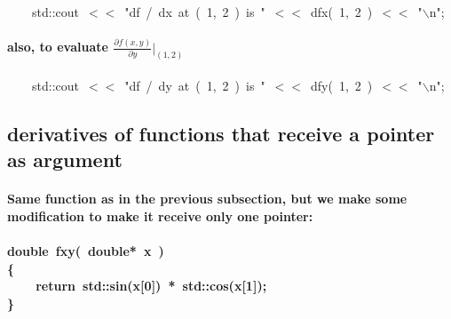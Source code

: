\documentclass[9pt,onside]{article}
\newcommand{\hlstd}[1]{\textcolor[rgb]{0.2,0,0.4}{#1}}
\newcommand{\hlnum}[1]{\textcolor[rgb]{0.2,0.73,0.02}{#1}}
\newcommand{\hlesc}[1]{\textcolor[rgb]{0.65,0.09,0.38}{#1}}
\newcommand{\hlstr}[1]{\textcolor[rgb]{0.09,0.38,0.65}{#1}}
\newcommand{\hlopt}[1]{\textcolor[rgb]{0.33,0.33,0.33}{#1}}
\newcommand{\hlkwa}[1]{\textcolor[rgb]{1,0.19,0.19}{#1}}
\newcommand{\hlkwb}[1]{\textcolor[rgb]{0.96,0.55,0.14}{#1}}
\newcommand{\hlkwd}[1]{\textcolor[rgb]{0.82,0.11,0.93}{#1}}
\begin{document}
\hlstd{\ \ \ \ }\hlstd{std}\hlopt{::}\hlstd{cout\ }\hlopt{$<$$<$\ }\hlstd{}\hlstr{"df\ /\ dx\ at\ (\ 1,\ 2\ )\ is\ "}\hlstd{\ }\hlopt{$<$$<$\ }\hlstd{}\hlkwd{dfx}\hlstd{}\hlopt{(\ }\hlstd{}\hlnum{1}\hlstd{}\hlopt{,\ }\hlstd{}\hlnum{2\ }\hlstd{}\hlopt{)\ $<$$<$\ }\hlstd{}\hlstr{"}\hlesc{$\backslash$n}\hlstr{"}\hlstd{}\hlopt{;}\hspace*{\fill}\\

\paragraph{also, to evaluate $\frac{\partial{f(x,y)}}{\partial{y}} \Big|_{(1,2)}$\\}

\hlstd{}\hlstd{\ \ \ \ }\hlstd{std}\hlopt{::}\hlstd{cout\ }\hlopt{$<$$<$\ }\hlstd{}\hlstr{"df\ /\ dy\ at\ (\ 1,\ 2\ )\ is\ "}\hlstd{\ }\hlopt{$<$$<$\ }\hlstd{}\hlkwd{dfy}\hlstd{}\hlopt{(\ }\hlstd{}\hlnum{1}\hlstd{}\hlopt{,\ }\hlstd{}\hlnum{2\ }\hlstd{}\hlopt{)\ $<$$<$\ }\hlstd{}\hlstr{"}\hlesc{$\backslash$n}\hlstr{"}\hlstd{}\hlopt{;}\hspace*{\fill}\\

\subsection{derivatives of functions that receive a pointer as argument}

\paragraph{Same function as in the previous subsection, but we make some modification to make it receive only one pointer:\\}
\paragraph{
\hlkwb{double\ }\hlstd{}\hlkwd{fxy}\hlstd{}\hlopt{(\ }\hlstd{}\hlkwb{double}\hlstd{}\hlopt{{*}\ }\hlstd{x\ }\hlopt{)}\hspace*{\fill}\\
\hlstd{}\hlopt{\{}\hspace*{\fill}\\
\hlstd{}\hlstd{\ \ \ \ }\hlstd{}\hlkwa{return\ }\hlstd{std}\hlopt{::}\hlstd{}\hlkwd{sin}\hlstd{}\hlopt{(}\hlstd{x}\hlopt{{[}}\hlstd{}\hlnum{0}\hlstd{}\hlopt{{]})\ {*}\ }\hlstd{std}\hlopt{::}\hlstd{}\hlkwd{cos}\hlstd{}\hlopt{(}\hlstd{x}\hlopt{{[}}\hlstd{}\hlnum{1}\hlstd{}\hlopt{{]});}\hspace*{\fill}\\
\hlstd{}\hlopt{\}}\hspace*{\fill}\\ }
\end{document}
